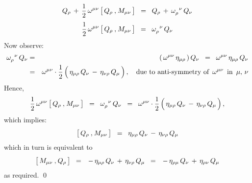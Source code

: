 \begin{equation*}
Q_{\rho}
\,+\,
\dfrac{1}{2}\,\omega^{\mu\nu}\left[\,
	Q_{\rho}\,\overset{{\color{white}1}}{,}\,M_{\mu\nu}
	\,\right]
\;\; = \;\;
	Q_{\rho}
	\,+\,
	\omega_{\rho}^{{\color{white}\mu}\nu}\,Q_{\nu}
\end{equation*}
\begin{equation*}
\dfrac{1}{2}\,\omega^{\mu\nu}\left[\,
	Q_{\rho}\,\overset{{\color{white}1}}{,}\,M_{\mu\nu}
	\,\right]
\;\; = \;\;
	\omega_{\rho}^{{\color{white}\mu}\nu}\,Q_{\nu}
\end{equation*}
Now observe:
\begin{eqnarray*}
\omega_{\rho}^{{\color{white}\mu}\nu}\,Q_{\nu}
& = &
	\left(\,\omega^{\mu\nu}\,\eta_{\mu\rho}\,\right)Q_{\nu}
\;\; = \;\;
	\omega^{\mu\nu}\,\eta_{\mu\rho}\,Q_{\nu}
\\
& = &
	\omega^{\mu\nu}\cdot\dfrac{1}{2}\left(\,
		\eta_{\mu\rho}\,Q_{\nu}
		\,\overset{{\color{white}.}}{-}\,
		\eta_{\nu\rho}\,Q_{\mu}
		\,\right),
	\quad
	\textnormal{due to anti-symmetry of \,$\omega^{\mu\nu}$\, in \,$\mu,\,\nu$}
\end{eqnarray*}
Hence,
\begin{equation*}
\dfrac{1}{2}\,\omega^{\mu\nu}\left[\,
	Q_{\rho}\,\overset{{\color{white}1}}{,}\,M_{\mu\nu}
	\,\right]
\;\; = \;\;
	\omega_{\rho}^{{\color{white}\mu}\nu}\,Q_{\nu}
\;\; = \;\;
	\omega^{\mu\nu}\cdot\dfrac{1}{2}\left(\,
		\eta_{\mu\rho}\,Q_{\nu}
		\,\overset{{\color{white}.}}{-}\,
		\eta_{\nu\rho}\,Q_{\mu}
		\,\right),
\end{equation*}
which implies:
\begin{equation*}
\left[\,
	Q_{\rho}\,\overset{{\color{white}1}}{,}\,M_{\mu\nu}
	\,\right]
\;\; = \;\;
	\eta_{\mu\rho}\,Q_{\nu}
	\,\overset{{\color{white}.}}{-}\,
	\eta_{\nu\rho}\,Q_{\mu}
\end{equation*}
which in turn is equivalent to
\begin{equation*}
\left[\,
	M_{\mu\nu}\,\overset{{\color{white}1}}{,}\,Q_{\rho}
	\,\right]
\;\; = \;\;
	\,\overset{{\color{white}.}}{-}\,
	\eta_{\mu\rho}\,Q_{\nu}
	\,\overset{{\color{white}.}}{+}\,
	\eta_{\nu\rho}\,Q_{\mu}
\;\; = \;\;
	\,\overset{{\color{white}.}}{-}\,
	\eta_{\rho\mu}\,Q_{\nu}
	\,\overset{{\color{white}.}}{+}\,
	\eta_{\rho\nu}\,Q_{\mu}
\end{equation*}
as required.
\qed


